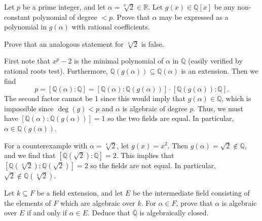 \documentclass[../../master.tex]{subfiles}
\begin{document}
\begin{problem}
    Let $p$ be a prime integer, and let $\alpha = \sqrt[p]{2} \in \mathbb{R}$.
    Let $g(x) \in \mathbb{Q}[x]$ be any non-constant polynomial of degree $< p$.
    Prove that $\alpha$ may be expressed as a polynomial in $g(\alpha)$ with rational coefficients.

    Prove that an analogous statement for $\sqrt[4]{2}$ is false.
\end{problem}

\begin{solution}
    First note that $x^{p} - 2$ is the minimal polynomial of $\alpha$ in $\mathbb{Q}$ (easily verified by rational roots test).
    Furthermore, $\mathbb{Q}(g(\alpha)) \subseteq \mathbb{Q}(\alpha)$ is an extension.
    Then we find
    \[
        p = [\mathbb{Q}(\alpha) : \mathbb{Q}] = [\mathbb{Q}(\alpha) : \mathbb{Q}(g(\alpha))] \cdot [\mathbb{Q}(g(\alpha)) : \mathbb{Q}].
    \]
    The second factor cannot be 1 since this would imply that $g(\alpha) \in \mathbb{Q}$, which is impossible since $\deg(g) < p$ and $\alpha$ is algebraic of degree $p$.
    Thus, we must have $[\mathbb{Q}(\alpha) : \mathbb{Q}(g(\alpha))] = 1$ so the two fields are equal.
    In particular, $\alpha \in \mathbb{Q}(g(\alpha))$.

    For a counterexample with $\alpha = \sqrt[4]{2}$, let $g(x) = x^2$.
    Then $g(\alpha) = \sqrt{2} \notin \mathbb{Q}$, and we find that $[\mathbb{Q}(\sqrt{2}) : \mathbb{Q}] = 2$.
    This implies that $[\mathbb{Q}(\sqrt[4]{2}) : \mathbb{Q}(\sqrt{2})] = 2$ so the fields are not equal.
    In particular, $\sqrt{2} \notin \mathbb{Q}(\sqrt[4]{2})$.
\end{solution}

\begin{problem}
    Let $k \subseteq F$ be a field extension, and let $E$ be the intermediate field consisting of the elements of $F$ which are algebraic over $k$.
    For $\alpha \in F$, prove that $\alpha$ is algebraic over $E$ if and only if $\alpha \in E$.
    Deduce that $\overline{\mathbb{Q}}$ is algebraically closed.
\end{problem}
\end{document}
